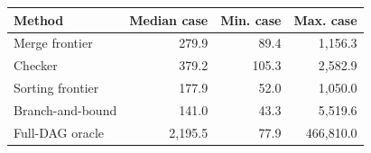 \begin{tabular}{lrrr}
\toprule
Method & Median case & Min. case & Max. case\\\midrule
Merge frontier & 279.9 & 89.4 & 1,156.3\\
Checker & 379.2 & 105.3 & 2,582.9\\
Sorting frontier & 177.9 & 52.0 & 1,050.0\\
Branch-and-bound & 141.0 & 43.3 & 5,519.6\\
Full-DAG oracle & 2,195.5 & 77.9 & 466,810.0\\
\bottomrule
\end{tabular}
